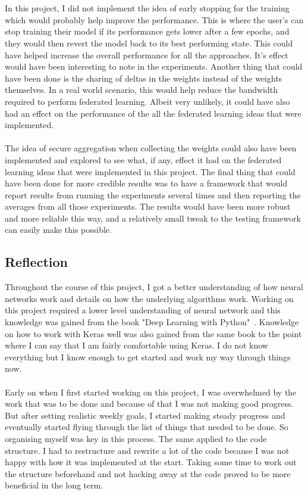 \documentclass[12pt]{article}
\newcommand{\comment}[1]{}
\begin{document}
\\\\
In this project, I did not implement the idea of early stopping for the training which would probably help improve the performance. This is where the user's can stop training their model if its performance gets lower after a few epochs, and they would then revert the model back to its best performing state. This could have helped increase the overall performance for all the approaches. It's effect would have been interesting to note in the experiments. Another thing that could have been done is the sharing of deltas in the weights instead of the weights themselves. In a real world scenario, this would help reduce the bandwidth required to perform federated learning. Albeit very unlikely, it could have also had an effect on the performance of the all the federated learning ideas that were implemented. 
\\\\
The idea of secure aggregation when collecting the weights could also have been implemented and explored to see what, if any, effect it had on the federated learning ideas that were implemented in this project. The final thing that could have been done for more credible results was to have a framework that would report results from running the experiments several times and then reporting the averages from all those experiments. The results would have been more robust and more reliable this way, and a relatively small tweak to the testing framework can easily make this possible. 
\comment{
	summary
	conclusions from work
		what does the project contribute to the human knowledge 
	future developments or line of eqnuiry suggested by the work
}
\subsection{Reflection}
Throughout the course of this project, I got a better understanding of how neural networks work and details on how the underlying algorithms work. Working on this project required a lower level understanding of neural network and this knowledge was gained from the book "Deep Learning with Python"~\cite{deeplearning}. Knowledge on how to work with Keras well was also gained from the same book to the point where I can say that I am fairly comfortable using Keras. I do not know everything but I know enough to get started and work my way through things now. 
\\\\
Early on when I first started working on this project, I was overwhelmed by the work that was to be done and because of that I was not making good progress. But after setting realistic weekly goals, I started making steady progress and eventually started flying through the list of things that needed to be done. So organising myself was key in this process. The same applied to the code structure. I had to restructure and rewrite a lot of the code because I was not happy with how it was implemented at the start. Taking some time to work out the structure beforehand and not hacking away at the code proved to be more beneficial in the long term. 
\end{document}
